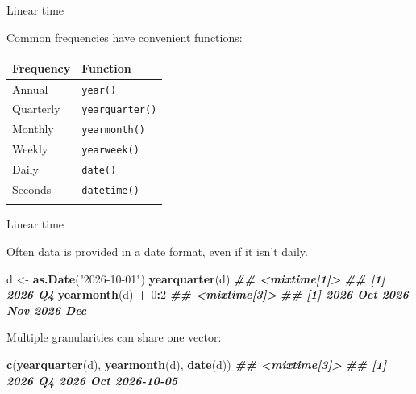 \documentclass[
  14pt,
  ignorenonframetext,
  aspectratio=169,
]{beamer}
\newenvironment{Shaded}{\begin{snugshade}}{\end{snugshade}}
\newcommand{\DecValTok}[1]{\textcolor[rgb]{0.00,0.00,0.81}{#1}}
\newcommand{\DocumentationTok}[1]{\textcolor[rgb]{0.56,0.35,0.01}{\textbf{\textit{#1}}}}
\newcommand{\FunctionTok}[1]{\textcolor[rgb]{0.13,0.29,0.53}{\textbf{#1}}}
\newcommand{\NormalTok}[1]{#1}
\newcommand{\OtherTok}[1]{\textcolor[rgb]{0.56,0.35,0.01}{#1}}
\newcommand{\SpecialCharTok}[1]{\textcolor[rgb]{0.81,0.36,0.00}{\textbf{#1}}}
\newcommand{\StringTok}[1]{\textcolor[rgb]{0.31,0.60,0.02}{#1}}
\newcounter{none} %
\renewenvironment{Shaded}{\vspace*{0.15cm}\color{black}\fontsize{10}{10}\sf\begin{snugshade}\color{black}}{\end{snugshade}}
\begin{document}
\begin{frame}[fragile]{Linear time}
\protect{}\label{linear-time}
\fontsize{12}{13}\sf

Common frequencies have convenient functions:

{\def\LTcaptype{none} %
\begin{longtable}[]{@{}ll@{}}
\toprule\noalign{}
Frequency & Function \\
\midrule\noalign{}
\endhead
Annual & \texttt{year()} \\
Quarterly & \texttt{yearquarter()} \\
Monthly & \texttt{yearmonth()} \\
Weekly & \texttt{yearweek()} \\
Daily & \texttt{date()} \\
Seconds & \texttt{datetime()} \\
\bottomrule\noalign{}
\end{longtable}
}
\end{frame}

\begin{frame}[fragile]{Linear time}
\protect{}\label{linear-time-1}
\fontsize{11}{12}\sf

Often data is provided in a date format, even if it isn't daily.

\begin{Shaded}
\begin{Highlighting}[]
\NormalTok{d }\OtherTok{\textless{}{-}} \FunctionTok{as.Date}\NormalTok{(}\StringTok{"2026{-}10{-}01"}\NormalTok{)}
\FunctionTok{yearquarter}\NormalTok{(d)}
\DocumentationTok{\#\# \textless{}mixtime[1]\textgreater{}}
\DocumentationTok{\#\# [1] 2026 Q4}
\FunctionTok{yearmonth}\NormalTok{(d) }\SpecialCharTok{+} \DecValTok{0}\SpecialCharTok{:}\DecValTok{2}
\DocumentationTok{\#\# \textless{}mixtime[3]\textgreater{}}
\DocumentationTok{\#\# [1] 2026 Oct 2026 Nov 2026 Dec}
\end{Highlighting}
\end{Shaded}

\pause

Multiple granularities can share one vector:

\begin{Shaded}
\begin{Highlighting}[]
\FunctionTok{c}\NormalTok{(}\FunctionTok{yearquarter}\NormalTok{(d), }\FunctionTok{yearmonth}\NormalTok{(d), }\FunctionTok{date}\NormalTok{(d))}
\DocumentationTok{\#\# \textless{}mixtime[3]\textgreater{}}
\DocumentationTok{\#\# [1] 2026 Q4    2026 Oct   2026{-}10{-}05}
\end{Highlighting}
\end{Shaded}
\end{frame}
\end{document}
